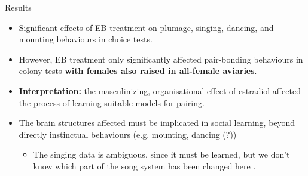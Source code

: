\documentclass[hyperref={pdfpagelabels=false}]{beamer}
\begin{document}
\begin{frame}{\citet{mansukhanietal1996}}
\begin{block}{Results}
\begin{itemize}
	\item Significant effects of EB treatment on plumage, singing, dancing, and mounting behaviours in choice tests.
	\item However, EB treatment only significantly affected pair-bonding behaviours in colony tests \textbf{with females also raised in all-female aviaries}.
	\item \textbf{Interpretation:} the masculinizing, organisational effect of estradiol affected the process of learning suitable models for pairing.
	\item The brain structures affected must be implicated in social learning, beyond directly instinctual behaviours (e.g. mounting, dancing (?))
		\begin{itemize}
			\item The singing data is ambiguous, since it must be learned, but we don't know which part of the song system has been changed here \citep[see][]{balthazartetal2009}.
		\end{itemize}
	\end{itemize}
\end{block}
\end{frame}
\end{document}
